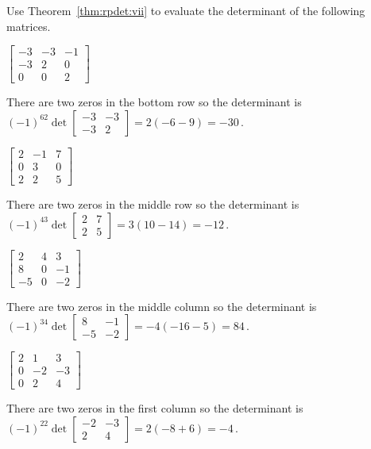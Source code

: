 \begin{example} \label{eg:}
Use Theorem~\ref{thm:rpdet:vii} to evaluate the determinant of the following matrices.  
\begin{parts}
\item \(\begin{bmatrix} -3&-3&-1\\-3&2&0\\0&0&2 \end{bmatrix}\)
\begin{solution} 
There are two zeros in the bottom row so the determinant is \((-1)^62\det\begin{bmatrix} -3&-3\\-3&2 \end{bmatrix}=2(-6-9)=-30\)\,. 
\end{solution}

\item \(\begin{bmatrix} 2&-1&7\\0&3&0\\2&2&5 \end{bmatrix}\)
\begin{solution} 
There are two zeros in the middle row so the determinant is \((-1)^43\det\begin{bmatrix} 2&7\\2&5 \end{bmatrix}=3(10-14)=-12\)\,. 
\end{solution}

\item \(\begin{bmatrix} 2&4&3\\8&0&-1\\-5&0&-2 \end{bmatrix}\)
\begin{solution} 
There are two zeros in the middle column so the determinant is \((-1)^34\det\begin{bmatrix} 8&-1\\-5&-2 \end{bmatrix}=-4(-16-5)=84\)\,. 
\end{solution}

\item \(\begin{bmatrix} 2&1&3\\0&-2&-3\\0&2&4 \end{bmatrix}\)
\begin{solution} 
There are two zeros in the first column so the determinant is \((-1)^22\det\begin{bmatrix} -2&-3\\2&4 \end{bmatrix}=2(-8+6)=-4\)\,. 
\end{solution}

\end{parts}
\end{example}



